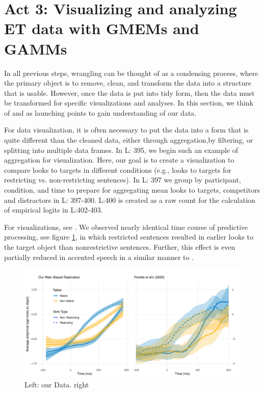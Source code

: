 \section{Act 3: Visualizing and analyzing ET data with GMEMs and GAMMs}

In all previous steps, wrangling can be thought of as a condensing process, where the primary object is to remove, clean, and transform the data into a structure that is usable. However, once the data is put into tidy form, then the data must be transformed for specific  visualizations and analyses. In this section, we think of  and  as launching points to gain understanding of our data. 

For data visualization, it is often necessary to put the data into a form that is quite different than the cleaned data, either through aggregation,by filtering, or splitting into multiple data frames. In L: 395, we begin such an example of aggregation for visualization. Here, our goal is to create a visualization to compare looks to targets in different conditions (e.g., looks to targets for  restricting vs.  non-restricting sentences). In L: 397 we group by participant, condition, and time to prepare for aggregating mean looks to targets, competitors and distractors in L: 397-400. L:400 is created as a raw count for the calculation of empirical logits in L:402-403.



For  visualizations, see . We observed nearly identical time course of predictive processing, see figure \ref{fig:smooth}, in which restricted sentences resulted in earlier looks to the target object than nonrestrictive sentences. Further, this effect is even partially reduced in accented speech in a similar manner to \textcite{Porretta_et_al_2020}. 

\begin{figure}[h]
    \centering
    \includegraphics[width=\textwidth]{figures/smooth_comparison_plot.pdf}
    \caption{Left: our Data. right \parencite{Porretta_et_al_2020}}
    \label{fig:smooth}
\end{figure}

